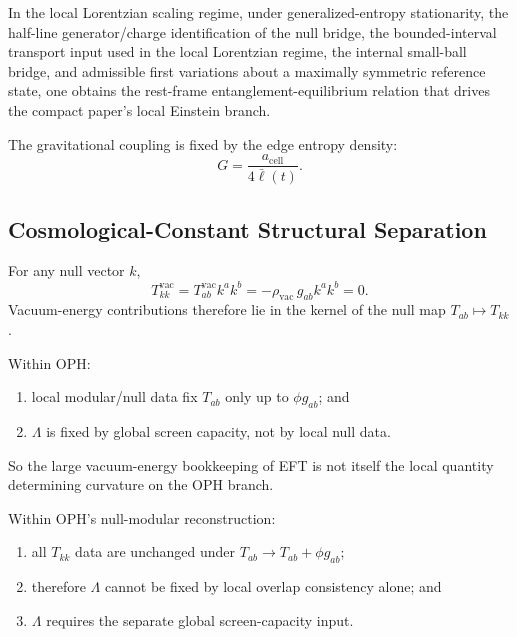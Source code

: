 \begin{theorem}
In the local Lorentzian scaling regime, under generalized-entropy stationarity, the half-line
generator/charge identification of the null bridge, the bounded-interval transport input used in
the local Lorentzian regime, the internal small-ball bridge, and admissible first variations
about a maximally symmetric reference state, one obtains the rest-frame entanglement-equilibrium
relation that drives the compact paper's local Einstein branch.
\end{theorem}

\begin{theorem}
The gravitational coupling is fixed by the edge entropy density:
\[
G=\frac{a_{\mathrm{cell}}}{4\bar{\ell}(t)}.
\]
\end{theorem}

\subsection{Cosmological-Constant Structural Separation}

\begin{lemma}
For any null vector \(k\),
\[
T^{\mathrm{vac}}_{kk}
=
T^{\mathrm{vac}}_{ab}k^ak^b
=
-\rho_{\mathrm{vac}}\,g_{ab}k^ak^b
=
0.
\]
Vacuum-energy contributions therefore lie in the kernel of the null map
\(T_{ab}\mapsto T_{kk}\).
\end{lemma}

\begin{proposition}
Within OPH:
\begin{enumerate}[leftmargin=2em]
\item local modular/null data fix \(T_{ab}\) only up to \(\phi g_{ab}\); and
\item \(\Lambda\) is fixed by global screen capacity, not by local null data.
\end{enumerate}
So the large vacuum-energy bookkeeping of EFT is not itself the local quantity determining
curvature on the OPH branch.
\end{proposition}

\begin{theorem}
Within OPH's null-modular reconstruction:
\begin{enumerate}[leftmargin=2em]
\item all \(T_{kk}\) data are unchanged under \(T_{ab}\to T_{ab}+\phi g_{ab}\);
\item therefore \(\Lambda\) cannot be fixed by local overlap consistency alone; and
\item \(\Lambda\) requires the separate global screen-capacity input.
\end{enumerate}
\end{theorem}

